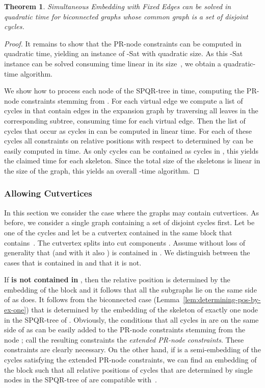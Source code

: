 \documentclass{scrartcl}
\newcommand{\1}[1]{{\normalfont \ensuremath{#1^{\tiny\circled{1}}}}} \newcommand{\2}[1]{{\normalfont \ensuremath{#1^{\tiny\circled{2}}}}} \renewcommand{\k}[1]{{\normalfont \ensuremath{#1^{\tiny\circled{k}}}}} \newcommand{\proj}[2]{\ensuremath{\left.#1\right|_{#2}}} \newcommand{\eps}{\varepsilon}
\theoremstyle{plain} \newtheorem{theorem}{Theorem} \newcounter{lemmacounter} \setcounter{lemmacounter}{0} \newtheorem{lemma}[lemmacounter]{Lemma} \newtheorem{fact}{Fact}  \newtheorem{corollary}{Corollary} \theoremstyle{definition} \newtheorem{definition}{Definition}
\begin{document}
\begin{theorem} 
  \label{thm:sefe-biconnected-quadratic}
  {\sc Simultaneous Embedding with Fixed Edges} can be solved in
  quadratic time for biconnected graphs whose common graph is a set of
  disjoint cycles.
\end{theorem}
\begin{proof}
  It remains to show that the PR-node constraints can be computed in
  quadratic time, yielding an instance of {-Sat} with quadratic
  size.  As this {-Sat} instance can be solved consuming time
  linear in its size~\cite{ComplexityofTimetable-Even.etal(76),
    linear-timealgorithmtesting-Aspvall.etal(79)}, we obtain a
  quadratic-time algorithm.

  We show how to process each node  of the SPQR-tree in  time, computing the PR-node constraints
  stemming from .  For each virtual edge  we compute a list
  of cycles in  that contain edges in the expansion graph
   by traversing all leaves in the corresponding
  subtree, consuming  time for each virtual edge.  Then
  the list of cycles that occur as cycles in  can be
  computed in linear time.  For each of these cycles  all
  constraints on relative positions with respect to  determined by
   can be easily computed in  time.  As only
   cycles can be contained as cycles in
  , this yields the claimed  time for each skeleton.  Since the total size of the
  skeletons is linear in the size of the graph, this yields an overall
  -time algorithm.
\end{proof}

\subsubsection*{Allowing Cutvertices}
\label{sec:cutvertices}

In this section we consider the case where the graphs may contain
cutvertices.  As before, we consider a single graph  containing a
set of disjoint cycles  first.  Let
 be one of the cycles and let  be a cutvertex
contained in the same block  that contains~.  The cutvertex 
splits  into  cut components .  Assume
without loss of generality that  (and with it also ) is
contained in .  We distinguish between the cases that  is
contained in  and that it is not.

If {\bf  is not contained in }, then
the relative position  is determined by the embedding of
the block  and it follows that all the subgraphs  lie on the same side of  as  does.  It follows from the
biconnected case (Lemma~\ref{lem:determining-pos-by-ex-one}) that
 is determined by the embedding of the skeleton of
exactly one node  in the SPQR-tree of .  Obviously, the
conditions that all cycles in  are on the same
side of  as  can be easily added to the PR-node constraints
stemming from the node ; call the resulting constraints the
\emph{extended PR-node constraints}.  These constraints are clearly
necessary.  On the other hand, if  is a
semi-embedding of the cycles satisfying the extended PR-node
constraints, we can find an embedding  of the block 
such that all relative positions of cycles that are determined by
single nodes in the SPQR-tree of  are compatible with~.
\end{document}
